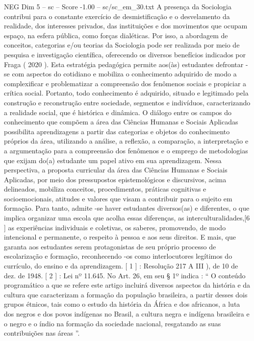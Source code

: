 \begin{textsample}{NEG Dim 5 – sc – Score -1.00 – sc/sc\_em\_30.txt}
A presença da Sociologia contribui para o constante exercício de desmistificação e o desvelamento da realidade, dos interesses privados, das instituições e dos movimentos que ocupam espaço, na esfera pública, como forças dialéticas.
Por isso, a abordagem de conceitos, categorias e/ou teorias da Sociologia pode ser realizada por meio de pesquisa e investigação científica, oferecendo os diversos benefícios indicados por Fraga ( 2020 ).
Esta estratégia pedagógica permite aos(às) estudantes defrontar -se com aspectos do cotidiano e mobiliza o conhecimento adquirido de modo a complexificar e problematizar a compreensão dos fenômenos sociais e propiciar a crítica social.
Portanto, todo conhecimento é adquirido, situado e legitimado pela construção e reconstrução entre sociedade, segmentos e indivíduos, caracterizando a realidade social, que é histórica e dinâmica.
O diálogo entre os campos do conhecimento que compõem a área das Ciências Humanas e Sociais Aplicadas possibilita aprendizagens a partir das categorias e objetos do conhecimento próprios da área, utilizando a análise, a reflexão, a comparação, a interpretação e a argumentação para a compreensão dos fenômenos e o emprego de metodologias que exijam do(a) estudante um papel ativo em sua aprendizagem.
Nessa perspectiva, a proposta curricular da área das Ciências Humanas e Sociais Aplicadas, por meio dos pressupostos epistemológicos e discursivos, acima delineados, mobiliza conceitos, procedimentos, práticas cognitivas e socioemocionais, atitudes e valores que visam a contribuir para o sujeito em formação.
Para tanto, admite -se haver estudantes diversos(as) e diferentes, o que implica organizar uma escola que acolha essas diferenças, as interculturalidades,[6 ] as experiências individuais e coletivas, os saberes, promovendo, de modo intencional e permanente, o respeito à pessoa e aos seus direitos.
E mais, que garanta aos estudantes serem protagonistas de seu próprio processo de escolarização e formação, reconhecendo -os como interlocutores legítimos do currículo, do ensino e da aprendizagem. [ 1 ] : Resolução 217 A III ), de 10 de dez. de 1948. [ 2 ] : Lei nº 11.645.
No Art. 26, em seu § 1º indica : “ O conteúdo programático a que se refere este artigo incluirá diversos aspectos da história e da cultura que caracterizam a formação da população brasileira, a partir desses dois grupos étnicos, tais como o estudo da história da África e dos africanos, a luta dos negros e dos povos indígenas no Brasil, a cultura negra e indígena brasileira e o negro e o índio na formação da sociedade nacional, resgatando as suas contribuições nas áreas ”.

\end{textsample}
